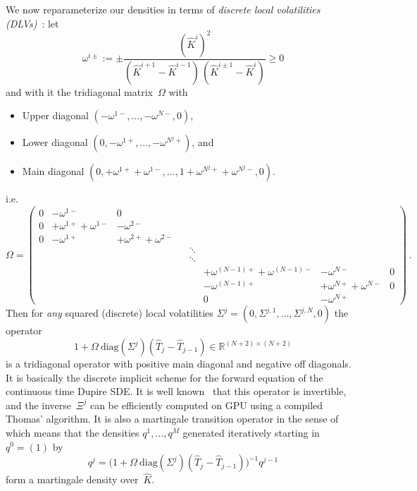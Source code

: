 \documentclass[11pt,a4paper]{article}
\newcommand{\R}{\mathbb{R}}
\DeclareRobustCommand{\eqx}{\begin{equation}}                                         %
\DeclareRobustCommand{\eqend}{\end{equation}}                                         %
\begin{document}
We now reparameterize our densities in terms of \emph{discrete local volatilities (DLVs)}~\cite{DLV}: let
$$     
    \omega^{i\pm} := \pm    \frac{ (\hat K^{i})^2 }{ (\hat K^{i+1} - \hat K^{i-1})\,(\hat K^{i\pm 1} - \hat K^{i}) }  \geq 0
$$
and with it the tridiagonal matrix~$\Omega$ with 
\begin{itemize}
    \item Upper diagonal $( -\omega^{1-}, \ldots, -\omega^{N-}, 0 )$,
    \item Lower diagonal $( 0, -\omega^{1+}, \ldots, -\omega^{N^j+} )$, and
    \item Main diagonal $( 0, +\omega^{1+}+\omega^{1-}, \ldots, 1+\omega^{N^j+}+\omega^{N^j-}, 0 )$.
\end{itemize}
i.e.
\eqx
    \Omega = \left(
                \begin{array}{cccccccccc}
                0 & -\omega^{1-} & 0 \\
                0 & +\omega^{1+}+\omega^{1-} & -\omega^{2-} \\
                0 & -\omega^{1+} & +\omega^{2+}+\omega^{2-} \\
                & & & &  \ddots\\
                & & & &  \ddots\\
                & & & & & +\omega^{(N-1)+}+\omega^{(N-1)-} & -\omega^{N-} & 0 \\
                & & & & & -\omega^{(N-1)+} & +\omega^{N+}+\omega^{N-} & 0 \\
                & & & & & 0 & -\omega^{N+} & 
                \end{array} 
    \right) \ .
\eqend
Then for \emph{any} squared (discrete) local volatilities $\Sigma^j = ( 0, \Sigma^{j,1}, \ldots, \Sigma^{j,N}, 0 )$
the operator
\eqx
            1 + \Omega\ \mathrm{diag}(\Sigma^j) (\hat T_j - \hat T_{j-1}) \in \R^{(N+2)\times(N+2)}
\eqend
is a tridiagonal operator with positive main diagonal and negative off diagonals. 
It is basically the discrete implicit scheme for the forward equation of the continuous time Dupire SDE.
It is well known~\cite{DLV}
that this operator is invertible, and the inverse~$\Xi^j$ can be efficiently computed on GPU using a compiled
Thomas' algorithm. It is also
a martingale transition operator in
 the sense of~\cite{DLV} which means that the densities $q^1,\ldots,q^M$ generated 
 iteratively starting in $q^0=(1)$ by
\begin{equation}\label{eq:densitytrans}
    q^j = \Big( 1 + \Omega\ \mathrm{diag}(\Sigma^j) (\hat T_j - \hat T_{j-1}) \Big)^{-1} q^{j-1} 
\end{equation}
form a martingale density over~$\hat K$.
\end{document}
